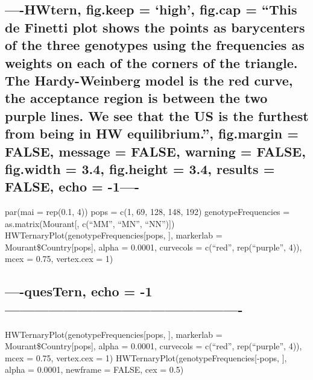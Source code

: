 \documentclass[]{article}
\begin{document}
\subsection{\texorpdfstring{----HWtern, fig.keep = `high', fig.cap =
``This \textbf{de Finetti plot} shows the points as barycenters of the
three genotypes using the frequencies as weights on each of the corners
of the triangle. The Hardy-Weinberg model is the red curve, the
acceptance region is between the two purple lines. We see that the US is
the furthest from being in HW equilibrium.'', fig.margin = FALSE,
message = FALSE, warning = FALSE, fig.width = 3.4, fig.height = 3.4,
results = FALSE, echo =
-1----}{----HWtern, fig.keep = high, fig.cap = This de Finetti plot shows the points as barycenters of the three genotypes using the frequencies as weights on each of the corners of the triangle. The Hardy-Weinberg model is the red curve, the acceptance region is between the two purple lines. We see that the US is the furthest from being in HW equilibrium., fig.margin = FALSE, message = FALSE, warning = FALSE, fig.width = 3.4, fig.height = 3.4, results = FALSE, echo = -1----}}\label{hwtern-fig.keep-high-fig.cap-this-de-finetti-plot-shows-the-points-as-barycenters-of-the-three-genotypes-using-the-frequencies-as-weights-on-each-of-the-corners-of-the-triangle.-the-hardy-weinberg-model-is-the-red-curve-the-acceptance-region-is-between-the-two-purple-lines.-we-see-that-the-us-is-the-furthest-from-being-in-hw-equilibrium.-fig.margin-false-message-false-warning-false-fig.width-3.4-fig.height-3.4-results-false-echo--1-}

par(mai = rep(0.1, 4)) pops = c(1, 69, 128, 148, 192)
genotypeFrequencies = as.matrix(Mourant{[}, c(``MM'', ``MN'',
``NN''){]}) HWTernaryPlot(genotypeFrequencies{[}pops, {]}, markerlab =
Mourant\$Country{[}pops{]}, alpha = 0.0001, curvecols = c(``red'',
rep(``purple'', 4)), mcex = 0.75, vertex.cex = 1)

\subsection{----quesTern, echo =
-1-------------------------------------------------}\label{questern-echo--1-}

HWTernaryPlot(genotypeFrequencies{[}pops, {]}, markerlab =
Mourant\$Country{[}pops{]}, alpha = 0.0001, curvecols = c(``red'',
rep(``purple'', 4)), mcex = 0.75, vertex.cex = 1)
HWTernaryPlot(genotypeFrequencies{[}-pops, {]}, alpha = 0.0001, newframe
= FALSE, cex = 0.5)
\end{document}
